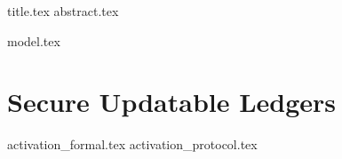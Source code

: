 \documentclass[runningheads]{llncs}
\begin{document}
{title.tex}
{abstract.tex}
\clearpage



{model.tex}

\section{Secure Updatable Ledgers}
{activation_formal.tex}
{activation_protocol.tex}


\clearpage




\appendix





\end{document}
